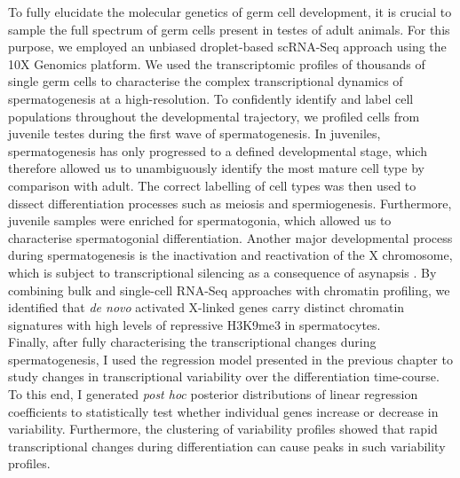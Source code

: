 To fully elucidate the molecular genetics of germ cell development, it is crucial to sample the full spectrum of germ cells present in testes of adult animals. For this purpose, we employed an unbiased droplet-based scRNA-Seq approach using the 10X Genomics\texttrademark{} platform. 
We used the transcriptomic profiles of thousands of single germ cells to characterise the complex transcriptional dynamics of spermatogenesis at a high-resolution. To confidently identify and label cell populations throughout the developmental trajectory, we profiled cells from juvenile testes during the first wave of spermatogenesis. In juveniles, spermatogenesis has only progressed to a defined developmental stage, which therefore allowed us to unambiguously identify the most mature cell type by comparison with adult. The correct labelling of cell types was then used to dissect differentiation processes such as meiosis and spermiogenesis. Furthermore, juvenile samples were enriched for spermatogonia, which allowed us to characterise spermatogonial differentiation. Another major developmental process during spermatogenesis is the inactivation and reactivation of the X chromosome, which is subject to transcriptional silencing as a consequence of asynapsis \citep{Turner2007}. By combining bulk and single-cell RNA-Seq approaches with chromatin profiling, we identified that \textit{de novo} activated X-linked genes carry distinct chromatin signatures with high levels of repressive H3K9me3 in spermatocytes. \\

Finally, after fully characterising the transcriptional changes during spermatogenesis, I used the regression model presented in the previous chapter to study changes in transcriptional variability over the differentiation time-course. To this end, I generated \emph{post hoc} posterior distributions of linear regression coefficients to statistically test whether individual genes increase or decrease in variability. Furthermore, the clustering of variability profiles showed that rapid transcriptional changes during differentiation can cause peaks in such variability profiles.
